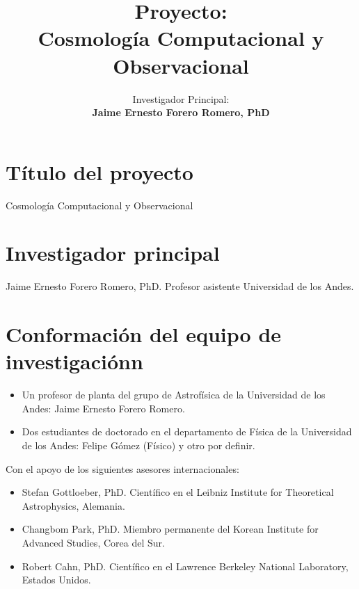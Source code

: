 \documentclass[12pt]{article}
\title{Proyecto:\\{\bf Cosmolog\'ia Computacional y Observacional}}
\author{Investigador Principal:\\{\bf Jaime Ernesto Forero Romero,
    PhD}\\
}
\begin{document}
\maketitle
\tableofcontents 

\section{T\'itulo del proyecto}
\noindent
Cosmolog\'ia Computacional y Observacional

\section{Investigador principal}

\noindent
Jaime Ernesto Forero Romero, PhD. Profesor asistente Universidad de los Andes. 


\section{Conformaci\'on del equipo de investigaci\'onn}



\begin{itemize}
\item Un profesor de planta del grupo de Astrof\'isica de la
  Universidad de los Andes: Jaime Ernesto  Forero Romero.  
\item Dos estudiantes de doctorado en el departamento de F\'isica de
  la Universidad de los Andes: Felipe G\'omez (F\'isico) y otro por
  definir.  
\end{itemize}

\noindent
Con el apoyo de los siguientes asesores internacionales:

\begin{itemize}

\item Stefan Gottloeber, PhD. Cient\'ifico en el Leibniz Institute for Theoretical Astrophysics, Alemania.
\item Changbom Park, PhD. Miembro permanente del Korean Institute for Advanced Studies, Corea del Sur.
\item Robert Cahn, PhD. Cient\'ifico en el Lawrence Berkeley National Laboratory, Estados   Unidos.
\end{itemize}
\end{document}
